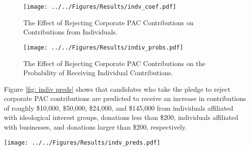 \documentclass[12pt]{article}
\begin{document}
\begin{figure*}[!htb]
    \centering
    \begin{subfigure}[b]{0.65\textwidth}
        \centering
        \texttt{[image: ../../Figures/Results/indv\_coef.pdf]}
        \caption{The Effect of Rejecting Corporate PAC Contributions on Contributions from Individuals.}
        \label{fig: indiv coefs}
    \end{subfigure}
    
    \begin{subfigure}[b]{0.65\textwidth}
        \centering
        \texttt{[image: ../../Figures/Results/indiv\_probs.pdf]}
        \caption{The Effect of Rejecting Corporate PAC Contributions on the Probability of Receiving Individual Contributions.}
        \label{fig: indiv probs}
    \end{subfigure}
    \caption{\textbf{The Effect of Rejecting Corporate PAC Contributions on Contributions and the Probability of Receiving Money from Individuals.} These figures present the posterior distributions estimated for a candidate that pledges to reject corporate PAC contributions. The dot shows the median coefficient estimate and the intervals show the 50\% and 89\% highest density intervals. Figure \ref{fig: indiv coefs} shows that candidates who differ by whether they pledge to reject corporate PAC contributions are expected to have more in contributions from small-dollar, total, ideological, large-dollar, and business individual contributions. Figure \ref{fig: indiv probs} shows that rejecting corporate PAC contributions has no effect on the probability of receiving contributions from individuals affiliated with labor or ideological interest groups. See Table \ref{tbl: indiv results} for the formal estimates.}
    \label{fig: indiv results}
\end{figure*}

Figure \ref{fig: indiv preds} shows that candidates who take the pledge to reject corporate PAC contributions are predicted to receive an increase in contributions of roughly \$10,000, \$50,000, \$24,000, and \$145,000 from individuals affiliated with ideological interest groups, donations less than \$200, individuals affiliated with businesses, and donations larger than \$200, respectively. 
 
\begin{figure*}[!htb]
    \centering
    \texttt{[image: ../../Figures/Results/indv\_preds.pdf]}
    \caption{\textbf{Total Predicted Contributions from Individuals by Candidate Type.} This figure shows that candidates who pledge to reject PAC contributions are predicted to received more contributions from individuals affiliated with ideological and business interests, as well as contributions less than and greater than \$200.}
    \label{fig: indiv preds}
\end{figure*}
\end{document}
